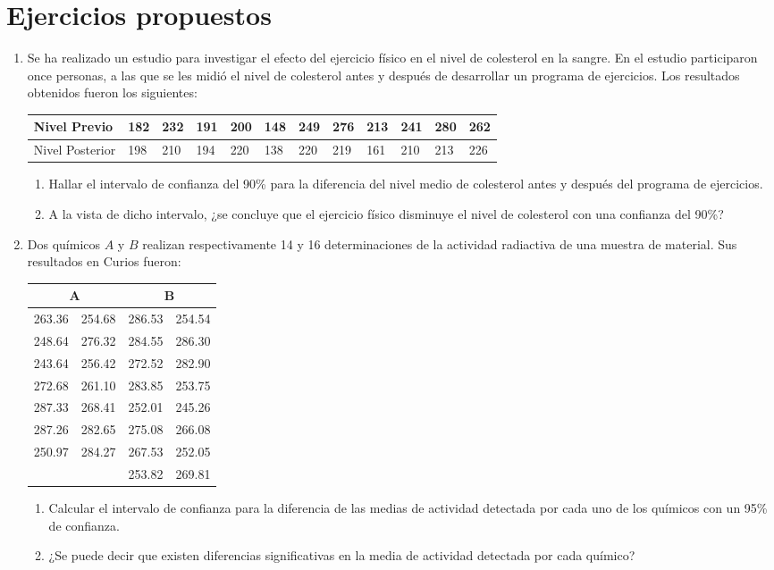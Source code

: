 \section{Ejercicios propuestos}
\begin{enumerate}[leftmargin=*]
\item  Se ha realizado un estudio para investigar el efecto del ejercicio físico en el nivel de colesterol en la
sangre. En el estudio participaron once personas, a las que se les midió el nivel de colesterol antes y después de
desarrollar un programa de ejercicios. Los resultados obtenidos fueron los siguientes:
\begin{center}
\begin{tabular}{|l|l|l|l|l|l|l|l|l|l|l|l|}
\hline
Nivel Previo & 182 & 232 & 191 & 200 & 148 & 249 & 276 & 213 & 241 & 280 & 262 \\
\hline
Nivel Posterior & 198 & 210 & 194 & 220 & 138 & 220 & 219 & 161 & 210 & 213 & 226 \\
\hline
\end{tabular}
\end{center}

\begin{enumerate}
\item Hallar el intervalo de confianza del 90\% para la diferencia del nivel medio de colesterol antes y después del
programa de ejercicios.
\item A la vista de dicho intervalo, ¿se concluye que el ejercicio físico disminuye el nivel de colesterol con una
confianza del 90\%?
\end {enumerate}

\item Dos químicos $A$ y $B$ realizan respectivamente 14 y 16 determinaciones de la actividad radiactiva de una muestra
de material. Sus resultados en Curios fueron:
\begin{center}
\begin{tabular}{ll|ll}
\multicolumn{2}{c|}{A} & \multicolumn{2}{c}{B} \\
\hline
263.36 & 254.68 & 286.53 & 254.54 \\
248.64 & 276.32 & 284.55 & 286.30 \\
243.64 & 256.42 & 272.52 & 282.90 \\
272.68 & 261.10 & 283.85 & 253.75 \\
287.33 & 268.41 & 252.01 & 245.26 \\
287.26 & 282.65 & 275.08 & 266.08 \\
250.97 & 284.27 & 267.53 & 252.05 \\
 &  & 253.82 & 269.81 \\
\end{tabular}
\end{center}
\begin{enumerate}
\item  Calcular el intervalo de confianza para la diferencia de las medias de actividad detectada por cada uno de los
químicos con un 95\% de confianza.
\item ¿Se puede decir que existen diferencias significativas en la media de actividad detectada por cada químico?
\end{enumerate}


\end{enumerate}
